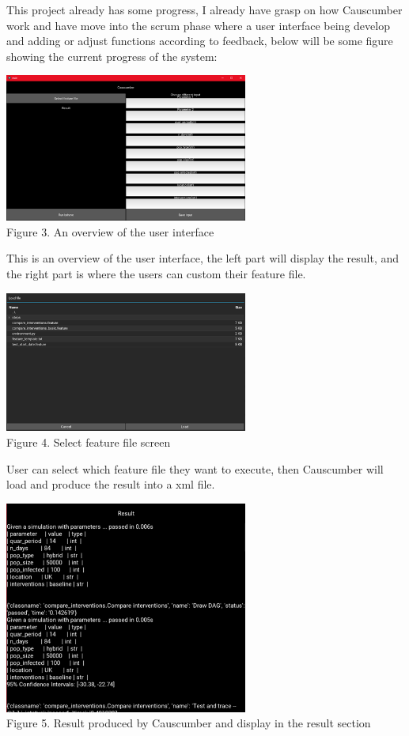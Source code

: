 This project already has some progress, I already have grasp on how Causcumber work and have move into the scrum phase where a user interface being develop and adding or adjust functions according to feedback, below will be some figure showing the current progress of the system:
\begin{center}
	\includegraphics[width=8cm]{figures/Gui_overview.png}\\
	Figure 3. An overview of the user interface
\end{center}
This is an overview of the user interface, the left part will display the result, and the right part is where the users can custom their feature file.
\begin{center}
	\includegraphics[width=8cm]{figures/select_feature_file.png}\\
	Figure 4. Select feature file screen
\end{center}
User can select which feature file they want to execute, then Causcumber will load and produce the result into a xml file.
\begin{center}
	\includegraphics[width=8cm]{figures/Result_display.png}\\
	Figure 5. Result produced by Causcumber and display in the result section
\end{center}
